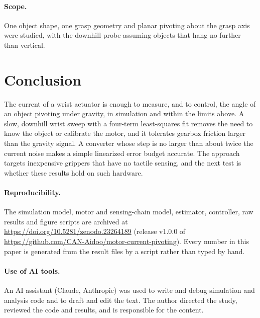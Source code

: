 \documentclass[11pt]{article}
\begin{document}
\paragraph{Scope.} One object shape, one grasp geometry and planar pivoting about the grasp axis were studied, with the downhill probe assuming objects that hang no further than vertical.

\section{Conclusion}
The current of a wrist actuator is enough to measure, and to control, the angle of an object pivoting under gravity, in simulation and within the limits above. A slow, downhill wrist sweep with a four-term least-squares fit removes the need to know the object or calibrate the motor, and it tolerates gearbox friction larger than the gravity signal. A converter whose step is no larger than about twice the current noise makes a simple linearized error budget accurate. The approach targets inexpensive grippers that have no tactile sensing, and the next test is whether these results hold on such hardware.

\paragraph{Reproducibility.} The simulation model, motor and sensing-chain model, estimator, controller, raw results and figure scripts are archived at \url{https://doi.org/10.5281/zenodo.23264189} (release v1.0.0 of \url{https://github.com/CAN-Aidoo/motor-current-pivoting}). Every number in this paper is generated from the result files by a script rather than typed by hand.

\paragraph{Use of AI tools.} An AI assistant (Claude, Anthropic) was used to write and debug simulation and analysis code and to draft and edit the text. The author directed the study, reviewed the code and results, and is responsible for the content.
\end{document}
